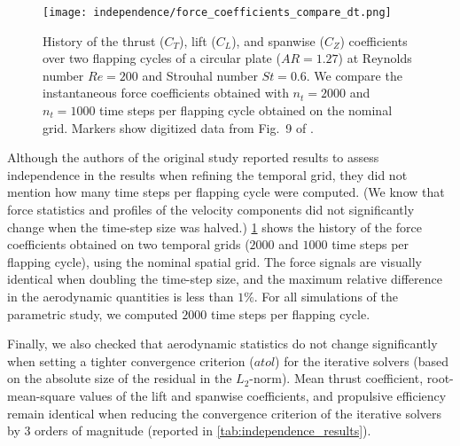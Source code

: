 \begin{figure}[!h]
  \centering
  \texttt{[image: independence/force\_coefficients\_compare\_dt.png]}
  \caption{History of the thrust ($C_T$), lift ($C_L$), and spanwise ($C_Z$) coefficients over two flapping cycles of a circular plate ($AR = 1.27$) at Reynolds number $Re = 200$ and Strouhal number $St = 0.6$. We compare the instantaneous force coefficients obtained with $n_t = 2000$ and $n_t = 1000$ time steps per flapping cycle obtained on the nominal grid. Markers show digitized data from Fig.~9 of \citet{li_dong_2016}.}
  \label{fig:independence_force_coefficients_dt}
\end{figure}

Although the authors of the original study reported results to assess independence in the results when refining the temporal grid, they did not mention how many time steps per flapping cycle were computed.
(We know that force statistics and profiles of the velocity components did not significantly change when the time-step size was halved.)
\cref{fig:independence_force_coefficients_dt} shows the history of the force coefficients obtained on two temporal grids ($2000$ and $1000$ time steps per flapping cycle), using the nominal spatial grid.
The force signals are visually identical when doubling the time-step size, and the maximum relative difference in the aerodynamic quantities is less than $1\%$.
For all simulations of the parametric study, we computed $2000$ time steps per flapping cycle.

Finally, we also checked that aerodynamic statistics do not change significantly when setting a tighter convergence criterion ($atol$) for the iterative solvers (based on the absolute size of the residual in the $L_2$-norm).
Mean thrust coefficient, root-mean-square values of the lift and spanwise coefficients, and propulsive efficiency remain identical when reducing the convergence criterion of the iterative solvers by 3 orders of magnitude (reported in \cref{tab:independence_results}).

